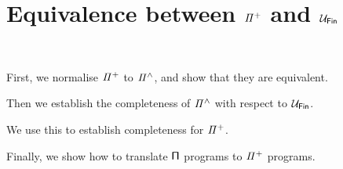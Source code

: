 \section{Equivalence between \texorpdfstring{$\mathit{{\Pi}^{+}}$}{Pi} and \texorpdfstring{$\UFin$}{UFin}}~\label{sec:equivalence}

First, we normalise $\mathit{{\Pi}^{+}}$ to $\mathit{{\Pi}^{\wedge}}$, and show that they are equivalent.

Then we establish the completeness of $\mathit{{\Pi}^{\wedge}}$ with respect to $\UFin$.

We use this to establish completeness for $\mathit{{\Pi}^{+}}$.

Finally, we show how to translate $\mathsf{\Pi}$ programs to $\mathit{{\Pi}^{+}}$ programs.

